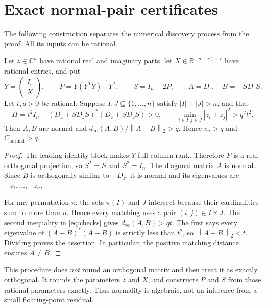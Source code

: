 \documentclass[11pt,letterpaper]{article}
\theoremstyle{remark}\newtheorem{remark}[theorem]{Remark}
\newcommand{\C}{\mathbb C}\newcommand{\R}{\mathbb R}\newcommand{\cn}{C_{\mathrm{normal}}}\newcommand{\din}{d_{\infty}}
\newcommand{\norm}[1]{\left\lVert#1\right\rVert_2}\newcommand{\abs}[1]{\left|#1\right|}\newcommand{\diag}{\operatorname{diag}}\newcommand{\rank}{\operatorname{rank}}
\begin{document}
\section{Exact normal-pair certificates}\label{sec:certificates}
The following construction separates the numerical discovery process from the proof. All its inputs can be rational.

\begin{lemma}\label{lem:certificate}
Let $z\in\C^n$ have rational real and imaginary parts, let $X\in\R^{(n-r)\times r}$ have rational entries, and put
\begin{equation}\label{eq:construction}
Y=\begin{pmatrix}I_r\\X\end{pmatrix},\qquad
P=Y(Y^TY)^{-1}Y^T,\qquad S=I_n-2P,\qquad
A=D_z,\quad B=-SD_zS.
\end{equation}
Let $t,q>0$ be rational. Suppose $I,J\subseteq\{1,\ldots,n\}$ satisfy $|I|+|J|>n$, and that
\begin{equation}\label{eq:checks}
H=t^2I_n-(D_z+SD_zS)^*(D_z+SD_zS)>0,
\qquad
\min_{i\in I,j\in J}|z_i+z_j|^2>q^2t^2.
\end{equation}
Then $A,B$ are normal and $\din(A,B)/\norm{A-B}>q$. Hence $c_n>q$ and $\cn>q$.
\end{lemma}
\begin{proof}
The leading identity block makes $Y$ full column rank. Therefore $P$ is a real orthogonal projection, so $S^T=S$ and $S^2=I_n$. The diagonal matrix $A$ is normal. Since $B$ is orthogonally similar to $-D_z$, it is normal and its eigenvalues are $-z_1,\ldots,-z_n$.

For any permutation $\pi$, the sets $\pi(I)$ and $J$ intersect because their cardinalities sum to more than $n$. Hence every matching uses a pair $(i,j)\in I\times J$. The second inequality in \eqref{eq:checks} gives $\din(A,B)>qt$. The first says every eigenvalue of $(A-B)^*(A-B)$ is strictly less than $t^2$, so $\norm{A-B}<t$. Dividing proves the assertion. In particular, the positive matching distance ensures $A\ne B$.
\end{proof}

This procedure does \emph{not} round an orthogonal matrix and then treat it as exactly orthogonal. It rounds the parameters $z$ and $X$, and constructs $P$ and $S$ from those rational parameters exactly. Thus normality is algebraic, not an inference from a small floating-point residual.
\end{document}
